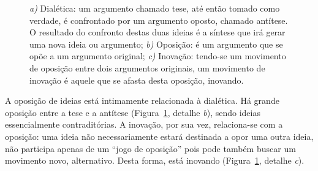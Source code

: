 \begin{figure}[ht!]
\begin{center}


\caption{\textit{a)} Dialética: um argumento chamado tese, até então tomado como verdade, é confrontado por um argumento oposto, chamado antítese. O resultado do confronto destas duas ideias é a síntese que irá gerar uma nova ideia ou argumento; \textit{b)} Oposição: é um argumento que se opõe a um argumento original; \textit{c)} Inovação: tendo-se um movimento de oposição entre dois argumentos originais, um movimento de inovação é aquele que se afasta desta oposição, inovando.}
\label{fig:conceitos}
\end{center}
\end{figure}

A oposição de ideias está intimamente relacionada à dialética. Há
grande oposição entre a tese e a antítese (Figura~\ref{fig:conceitos},
detalhe \textit{b}), sendo ideias essencialmente contraditórias. A
inovação, por sua vez, relaciona-se com a oposição: uma ideia não
necessariamente estará destinada a opor uma outra ideia, não participa
apenas de um ``jogo de oposição'' pois pode também buscar um movimento
novo, alternativo. Desta forma, está inovando
(Figura~\ref{fig:conceitos}, detalhe \textit{c}).

